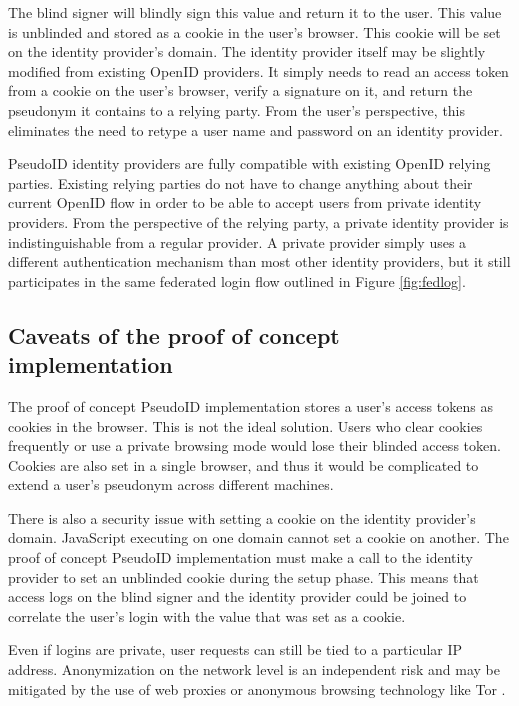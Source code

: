 \documentclass{llncs}
\begin{document}
The blind signer will blindly sign this value and return it to the
user. This value is unblinded and stored as a cookie in the user's
browser. This cookie will be set on the identity provider's
domain. The identity provider itself may be slightly modified from
existing OpenID providers. It simply needs to read an access token
from a cookie on the user's browser, verify a signature on it, and
return the pseudonym it contains to a relying party. From the user's
perspective, this eliminates the need to retype a user name and
password on an identity provider.

PseudoID identity providers are fully compatible with existing OpenID
relying parties. Existing relying parties do not have to change
anything about their current OpenID flow in order to be able to accept
users from private identity providers. From the perspective of the
relying party, a private identity provider is indistinguishable from a
regular provider. A private provider simply uses a different
authentication mechanism than most other identity providers, but it
still participates in the same federated login flow outlined in Figure
\ref{fig:fedlog}.

\subsection{Caveats of the proof of concept implementation}
\label{subsec:caveats}

The proof of concept PseudoID implementation stores a user's access
tokens as cookies in the browser. This is not the ideal solution. Users 
who clear cookies frequently or use a private browsing mode would
lose their blinded access token. Cookies are also set in a
single browser, and thus it would be complicated to extend a user's
pseudonym across different machines.

There is also a security issue with setting a cookie on the identity
provider's domain. JavaScript executing on one domain cannot set a
cookie on another. The proof of concept PseudoID implementation must
make a call to the identity provider to set an unblinded cookie during
the setup phase. This means that access logs on the blind signer and
the identity provider could be joined to correlate the user's login
with the value that was set as a cookie. 

Even if logins are private, user requests can still be tied to a
particular IP address. Anonymization on the network level is an
independent risk and may be mitigated by the use of web proxies or
anonymous browsing technology like Tor \cite{Tor}. 
\end{document}
